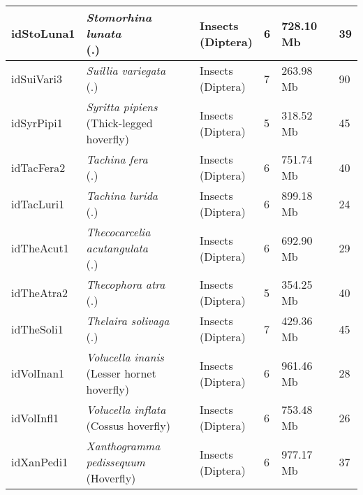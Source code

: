 \begin{centering}
\begin{longtable}{l|l|l|l|l|l}
idStoLuna1 & \makecell[{l}]{\textit{Stomorhina lunata} \\ (.)} & \makecell[{l}]{Insects \\ (Diptera)} & 6 & 728.10 Mb & 39  \\ \hline
idSuiVari3 & \makecell[{l}]{\textit{Suillia variegata} \\ (.)} & \makecell[{l}]{Insects \\ (Diptera)} & 7 & 263.98 Mb & 90  \\ \hline
idSyrPipi1 & \makecell[{l}]{\textit{Syritta pipiens} \\ (Thick-legged hoverfly)} & \makecell[{l}]{Insects \\ (Diptera)} & 5 & 318.52 Mb & 45  \\ \hline
idTacFera2 & \makecell[{l}]{\textit{Tachina fera} \\ (.)} & \makecell[{l}]{Insects \\ (Diptera)} & 6 & 751.74 Mb & 40  \\ \hline
idTacLuri1 & \makecell[{l}]{\textit{Tachina lurida} \\ (.)} & \makecell[{l}]{Insects \\ (Diptera)} & 6 & 899.18 Mb & 24  \\ \hline
idTheAcut1 & \makecell[{l}]{\textit{Thecocarcelia acutangulata} \\ (.)} & \makecell[{l}]{Insects \\ (Diptera)} & 6 & 692.90 Mb & 29  \\ \hline
idTheAtra2 & \makecell[{l}]{\textit{Thecophora atra} \\ (.)} & \makecell[{l}]{Insects \\ (Diptera)} & 5 & 354.25 Mb & 40  \\ \hline
idTheSoli1 & \makecell[{l}]{\textit{Thelaira solivaga} \\ (.)} & \makecell[{l}]{Insects \\ (Diptera)} & 7 & 429.36 Mb & 45  \\ \hline
idVolInan1 & \makecell[{l}]{\textit{Volucella inanis} \\ (Lesser hornet hoverfly)} & \makecell[{l}]{Insects \\ (Diptera)} & 6 & 961.46 Mb & 28  \\ \hline
idVolInfl1 & \makecell[{l}]{\textit{Volucella inflata} \\ (Cossus hoverfly)} & \makecell[{l}]{Insects \\ (Diptera)} & 6 & 753.48 Mb & 26  \\ \hline
idXanPedi1 & \makecell[{l}]{\textit{Xanthogramma pedissequum} \\ (Hoverfly)} & \makecell[{l}]{Insects \\ (Diptera)} & 6 & 977.17 Mb & 37  \\ \hline

\end{longtable}
\end{centering}
